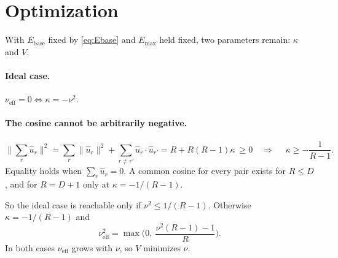 \documentclass[11pt,a4paper]{article}
\newcommand{\Ebase}{E_{\mathrm{base}}}
\newcommand{\Emax}{E_{\mathrm{max}}}
\newcommand{\uhat}{\hat{u}}
\newcommand{\nueff}{\nu_{\mathrm{eff}}}
\begin{document}
\section{Optimization}

With $\Ebase$ fixed by \eqref{eq:Ebase} and $\Emax$ held fixed, two parameters remain:
$\kappa$ and $V$.

\paragraph{Ideal case.} $\nueff=0\iff\kappa=-\nu^2$.

\paragraph{The cosine cannot be arbitrarily negative.}
\begin{equation}
  \Big\|\sum_r\uhat_r\Big\|^2=\sum_r\|\uhat_r\|^2+\sum_{r\neq r'}\uhat_r\cdot\uhat_{r'}
  =R+R(R-1)\kappa\ \ge0
  \quad\Longrightarrow\quad
  \boxed{\;\kappa\ge-\frac1{R-1}.\;}
\end{equation}
Equality holds when $\sum_r\uhat_r=0$. A common cosine for every pair exists for $R\le D$,
and for $R=D+1$ only at $\kappa=-1/(R-1)$.

So the ideal case is reachable only if $\nu^2\le1/(R-1)$. Otherwise
$\kappa=-1/(R-1)$ and
\begin{equation}
  \nueff^2=\max\Big(0,\ \frac{\nu^2(R-1)-1}{R}\Big).
  \label{eq:clip}
\end{equation}
In both cases $\nueff$ grows with $\nu$, so $V$ minimizes $\nu$.
\end{document}

